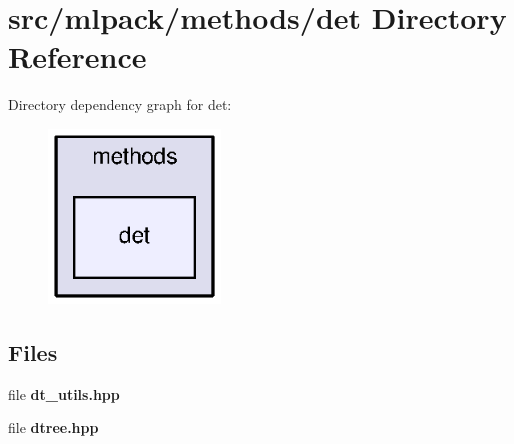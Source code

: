 \section{src/mlpack/methods/det Directory Reference}
\label{dir_829fd86abfc32d55a3f25eeda79942f5}
Directory dependency graph for det\+:
\nopagebreak
\begin{figure}[H]
\begin{center}
\leavevmode
\includegraphics[width=130pt]{dir_829fd86abfc32d55a3f25eeda79942f5_dep}
\end{center}
\end{figure}
\subsection*{Files}
\begin{DoxyCompactItemize}
\item 
file {\bf dt\+\_\+utils.\+hpp}
\item 
file {\bf dtree.\+hpp}
\end{DoxyCompactItemize}
